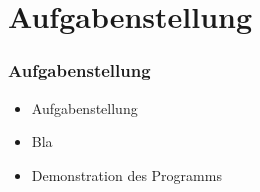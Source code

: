 
\section{Aufgabenstellung}
\begin{frame}
\frametitle{Aufgabenstellung}
\begin{block}{\vspace*{-3ex}}
	\begin{itemize}
	  \item Aufgabenstellung
	  \item Bla
	  \item Demonstration des Programms
	\end{itemize}
\end{block}
\end{frame}